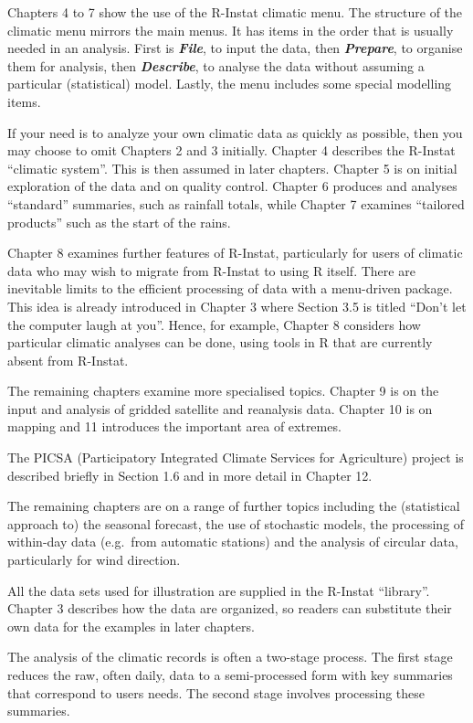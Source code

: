\documentclass[
  letterpaper,
  DIV=11,
  numbers=noendperiod]{scrreprt}
\begin{document}
Chapters 4 to 7 show the use of the R-Instat climatic menu. The
structure of the climatic menu mirrors the main menus. It has items in
the order that is usually needed in an analysis. First is
\textbf{\emph{File}}, to input the data, then \textbf{\emph{Prepare}},
to organise them for analysis, then \textbf{\emph{Describe}}, to analyse
the data without assuming a particular (statistical) model. Lastly, the
menu includes some special modelling items.

If your need is to analyze your own climatic data as quickly as
possible, then you may choose to omit Chapters 2 and 3 initially.
Chapter 4 describes the R-Instat ``climatic system''. This is then
assumed in later chapters. Chapter 5 is on initial exploration of the
data and on quality control. Chapter 6 produces and analyses
``standard'' summaries, such as rainfall totals, while Chapter 7
examines ``tailored products'' such as the start of the rains.

Chapter 8 examines further features of R-Instat, particularly for users
of climatic data who may wish to migrate from R-Instat to using R
itself. There are inevitable limits to the efficient processing of data
with a menu-driven package. This idea is already introduced in Chapter 3
where Section 3.5 is titled ``Don't let the computer laugh at you''.
Hence, for example, Chapter 8 considers how particular climatic analyses
can be done, using tools in R that are currently absent from R-Instat.

The remaining chapters examine more specialised topics. Chapter 9 is on
the input and analysis of gridded satellite and reanalysis data. Chapter
10 is on mapping and 11 introduces the important area of extremes.

The PICSA (Participatory Integrated Climate Services for Agriculture)
project is described briefly in Section 1.6 and in more detail in
Chapter 12.

The remaining chapters are on a range of further topics including the
(statistical approach to) the seasonal forecast, the use of stochastic
models, the processing of within-day data (e.g.~from automatic stations)
and the analysis of circular data, particularly for wind direction.

All the data sets used for illustration are supplied in the R-Instat
``library''. Chapter 3 describes how the data are organized, so readers
can substitute their own data for the examples in later chapters.

The analysis of the climatic records is often a two-stage process. The
first stage reduces the raw, often daily, data to a semi-processed form
with key summaries that correspond to users\textquotesingle{} needs. The
second stage involves processing these summaries.
\end{document}
